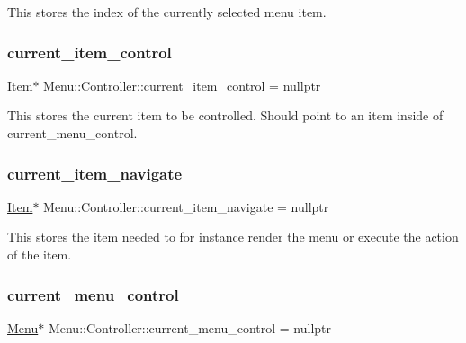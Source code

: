 This stores the index of the currently selected menu item. \hypertarget{class_menu_1_1_controller_a288e26b1efe4fd953b5514de72a1c508}{}\label{class_menu_1_1_controller_a288e26b1efe4fd953b5514de72a1c508} 
\subsubsection{\texorpdfstring{current\+\_\+item\+\_\+control}{current\_item\_control}}
{\footnotesize\ttfamily \hyperlink{struct_menu_1_1_item}{Item}$\ast$ Menu\+::\+Controller\+::current\+\_\+item\+\_\+control = nullptr\hspace{0.3cm}{\ttfamily [private]}}

This stores the current item to be controlled. Should point to an item inside of current\+\_\+menu\+\_\+control. \hypertarget{class_menu_1_1_controller_a6dfb1678cc8fd44570806ff680ac27cf}{}\label{class_menu_1_1_controller_a6dfb1678cc8fd44570806ff680ac27cf} 
\subsubsection{\texorpdfstring{current\+\_\+item\+\_\+navigate}{current\_item\_navigate}}
{\footnotesize\ttfamily \hyperlink{struct_menu_1_1_item}{Item}$\ast$ Menu\+::\+Controller\+::current\+\_\+item\+\_\+navigate = nullptr\hspace{0.3cm}{\ttfamily [private]}}

This stores the item needed to for instance render the menu or execute the action of the item. \hypertarget{class_menu_1_1_controller_a912ad4ad6b2c30e7cddf44547585a909}{}\label{class_menu_1_1_controller_a912ad4ad6b2c30e7cddf44547585a909} 
\subsubsection{\texorpdfstring{current\+\_\+menu\+\_\+control}{current\_menu\_control}}
{\footnotesize\ttfamily \hyperlink{struct_menu_1_1_menu}{Menu}$\ast$ Menu\+::\+Controller\+::current\+\_\+menu\+\_\+control = nullptr\hspace{0.3cm}{\ttfamily [private]}}

